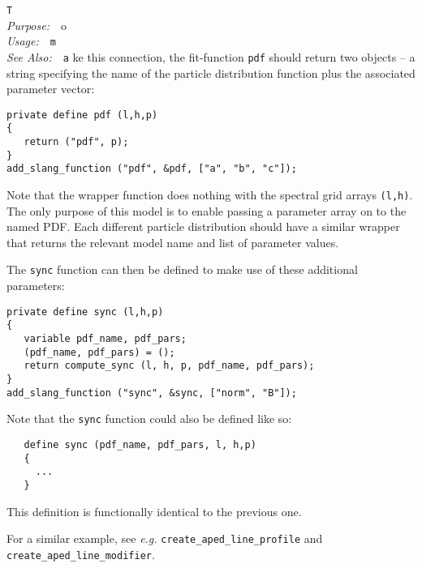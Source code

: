 \documentclass{book}
\makeatletter
\newif\ifpdf
\newenvironment{isisfunction}[4]%
{\index{{#1}@{\tt #1}}%
  \ifpdf
  \else
     \addcontentsline{toc}{subsection}{{#1} -- {#2}}
  \fi
  \vbox{
          \vspace*{\baselineskip}
          {\LARGE\tt #1}\vspace*{\baselineskip}\\
          {{\it Purpose:}~~{#2}}\\
          {{\it Usage:}~~{\tt #3}}\\
          {{\it See Also:}~~{\tt #4}}
       }
}%
{ }
\makeatother
\begin{document}
\begin{isisfunction}
To make this connection, the fit-function \verb|pdf| should
return two objects -- a string specifying the name of the
particle distribution function plus the associated parameter
vector:
\begin{verbatim}
private define pdf (l,h,p)
{
   return ("pdf", p);
}
add_slang_function ("pdf", &pdf, ["a", "b", "c"]);
\end{verbatim}
Note that the wrapper function does nothing with the spectral
grid arrays \verb|(l,h)|.  The only purpose of this model is
to enable passing a parameter array on to the named PDF.
Each different particle distribution should have a similar
wrapper that returns the relevant model name and list of
parameter values.

The \verb|sync| function can then be defined to make use of
these additional parameters:
\begin{verbatim}
private define sync (l,h,p)
{
   variable pdf_name, pdf_pars;
   (pdf_name, pdf_pars) = ();
   return compute_sync (l, h, p, pdf_name, pdf_pars);
}
add_slang_function ("sync", &sync, ["norm", "B"]);
\end{verbatim}
Note that the \verb|sync| function could also be defined
like so:
\begin{verbatim}
   define sync (pdf_name, pdf_pars, l, h,p)
   {
     ...
   }
\end{verbatim}
This definition is functionally identical to the previous one.

For a similar example, see {\it e.g.} \verb|create_aped_line_profile|
and \verb|create_aped_line_modifier|.
\end{isisfunction}
\end{document}
